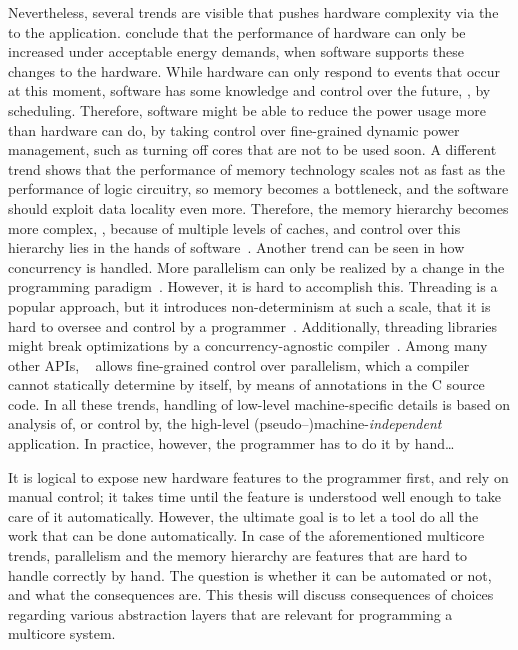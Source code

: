 Nevertheless, several trends are visible that pushes hardware complexity via the  to the application.
\citet{borkar:future} conclude that the performance of hardware can only be increased under acceptable energy demands, when software supports these changes to the hardware.
While hardware can only respond to events that occur at this moment, software has some knowledge and control over the future, \eg, by scheduling.
Therefore, software might be able to reduce the power usage more than hardware can do, by taking control over fine-grained dynamic power management, such as turning off cores that are not to be used soon.
A different trend shows that the performance of memory technology scales not as fast as the performance of logic circuitry, so memory becomes a bottleneck, and the software should exploit data locality even more.
Therefore, the memory hierarchy becomes more complex, \eg, because of multiple levels of caches, and control over this hierarchy lies in the hands of software~\cite{choi:denovo}.
Another trend can be seen in how concurrency is handled.
More parallelism can only be realized by a change in the programming paradigm~\cite{sutter:concurrency_revolution}.
However, it is hard to accomplish this.
Threading is a popular approach, but it introduces non-determinism at such a scale, that it is hard to oversee and control by a programmer~\cite{lee:problem_with_threads}.
Additionally, threading libraries might break optimizations by a concurrency-agnostic compiler~\cite{boehm:threads_no_lib}.
Among many other \acp{API}, ~\cite{dagum:openmp} allows fine-grained control over parallelism, which a compiler cannot statically determine by itself, by means of annotations in the C source code.
In all these trends, handling of low-level machine-specific details is based on analysis of, or control by, the high-level (pseudo--)machine-\emph{independent} application.
In practice, however, the programmer has to do it by hand\ldots

It is logical to expose new hardware features to the programmer first, and rely on manual control; it takes time until the feature is understood well enough to take care of it automatically.
However, the ultimate goal is to let a tool do all the work that can be done automatically.
In case of the aforementioned multicore trends, parallelism and the memory hierarchy are features that are hard to handle correctly by hand.
The question is whether it can be automated or not, and what the consequences are.
This thesis will discuss consequences of choices regarding various abstraction layers that are relevant for programming a multicore system.


